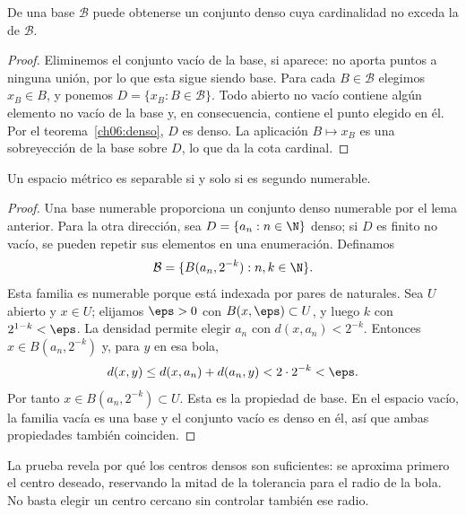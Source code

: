 \begin{lema}\label{ch06:baseadenso}
De una base $\mathcal B$ puede obtenerse un conjunto denso cuya cardinalidad no exceda la de $\mathcal B$.
\end{lema}
\begin{proof}
Eliminemos el conjunto vacío de la base, si aparece: no aporta puntos a ninguna unión, por lo que esta sigue siendo base. Para cada $B\in\mathcal B$ elegimos $x_B\in B$, y ponemos $D=\{x_B:B\in\mathcal B\}$. Todo abierto no vacío contiene algún elemento no vacío de la base y, en consecuencia, contiene el punto elegido en él. Por el teorema~\ref{ch06:denso}, $D$ es denso. La aplicación $B\mapsto x_B$ es una sobreyección de la base sobre $D$, lo que da la cota cardinal.
\end{proof}

\begin{teorema}\label{ch06:separablebase}
Un espacio métrico es separable si y solo si es segundo numerable.
\end{teorema}
\begin{proof}
Una base numerable proporciona un conjunto denso numerable por el lema anterior. Para la otra dirección, sea $D=\{a_n:n\in\N\}$ denso; si $D$ es finito no vacío, se pueden repetir sus elementos en una enumeración. Definamos
\[
\mathcal B=\{B(a_n,2^{-k}):n,k\in\N\}.
\]
Esta familia es numerable porque está indexada por pares de naturales. Sea $U$ abierto y $x\in U$; elijamos $\eps>0$ con $B(x,\eps)\subset U$, y luego $k$ con $2^{1-k}<\eps$. La densidad permite elegir $a_n$ con $d(x,a_n)<2^{-k}$. Entonces $x\in B(a_n,2^{-k})$ y, para $y$ en esa bola,
\[
d(x,y)\le d(x,a_n)+d(a_n,y)<2\cdot2^{-k}<\eps.
\]
Por tanto $x\in B(a_n,2^{-k})\subset U$. Esta es la propiedad de base. En el espacio vacío, la familia vacía es una base y el conjunto vacío es denso en él, así que ambas propiedades también coinciden.
\end{proof}
La prueba revela por qué los centros densos son suficientes: se aproxima primero el centro deseado, reservando la mitad de la tolerancia para el radio de la bola. No basta elegir un centro cercano sin controlar también ese radio.

